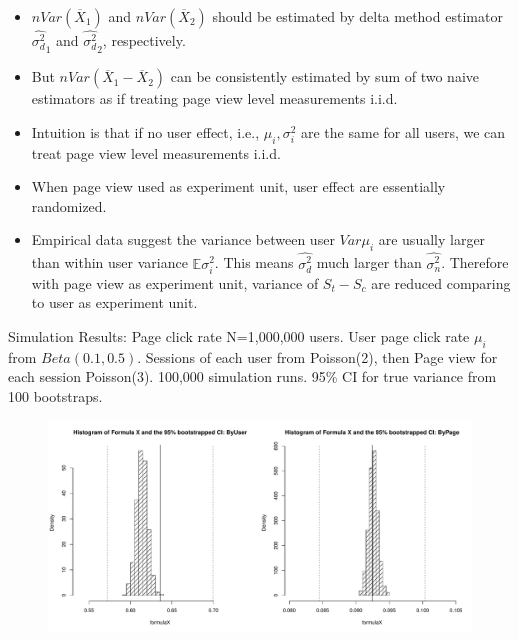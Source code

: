 \documentclass[xcolor=x11names,table]{beamer}
\newcommand{\bbe}{\mathbb{E}}
\newcommand{\wht}{\widehat}
\newcommand{\var}{Var}
\newcommand{\xbar}{\overline{X}}
\newcommand{\naiveest}{\wht{\sigma^2_n}}
\newcommand{\deltaest}{\wht{\sigma^2_d}}
\begin{document}
\begin{frame}
\begin{itemize}
\item  $n\var(\xbar_1)$ and $n\var (\xbar_2)$ should be estimated by delta method estimator $\deltaest_1$ and $\deltaest_2$, respectively.
\item But $n\var(\xbar_1-\xbar_2)$ can be consistently estimated by sum of two naive estimators as if treating page view level measurements i.i.d. 
\item Intuition is that if no user effect, i.e., $\mu_i,\sigma_i^2$ are the same for all users, we can treat page view level measurements i.i.d.
\item When page view used as experiment unit, user effect are essentially randomized. 
\item Empirical data suggest the variance between user $\var \mu_i$ are usually larger than within user variance $\bbe \sigma_i^2$. This means $\deltaest$ much larger than $\naiveest$. Therefore with page view as experiment unit, variance of $S_t-S_c$ are reduced comparing to user as experiment unit.
\end{itemize}
\end{frame}


\begin{frame}{Simulation Results: Page click rate}
N=1,000,000 users. User page click rate $\mu_i$ from $Beta(0.1,0.5)$. Sessions of each user from Poisson(2), then Page view for each session Poisson(3).  100,000 simulation runs. 95\% CI for true variance from 100 bootstraps. 
\begin{figure}[!htbp]
  \centering
  \includegraphics[width=1\textwidth]{jsm}
\end{figure}
\end{frame}
\end{document}

